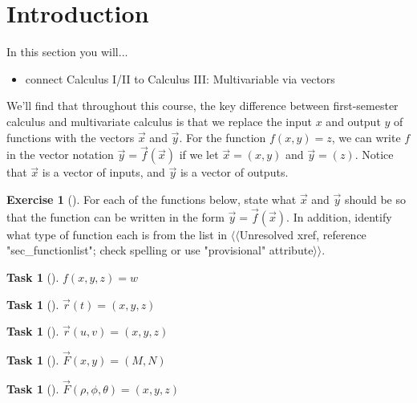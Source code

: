 \documentclass[10pt,]{book}
\theoremstyle{plain}
\theoremstyle{definition}
\theoremstyle{definition}
\theoremstyle{definition}
\theoremstyle{definition}
\newtheorem{exploration}[project]{Exercise}
\newtheorem{task}[project]{Task}
\theoremstyle{definition}
\numberwithin{equation}{section}
\begin{document}
\section[{Introduction}]{Introduction}\label{section-20}
In this section you will... \leavevmode%
\begin{itemize}[label=\textbullet]
\item{}connect Calculus I/II to Calculus III: Multivariable via vectors%
\end{itemize}
%
\par
We'll find that throughout this course, the key difference between first-semester calculus and multivariate calculus is that we replace the input \(x\) and output \(y\) of functions with the vectors \(\vec x\) and \(\vec y\). For the function \(f(x,y)=z\), we can write \(f\) in the vector notation \(\vec y=\vec f(\vec x)\) if we let \(\vec x=(x,y)\) and \(\vec y=(z)\). Notice that \(\vec x\) is a vector of inputs, and \(\vec y\) is a vector of outputs.%
\begin{exploration}[]\label{exploration-131}
For each of the functions below, state what \(\vec x\) and \(\vec y\) should be so that the function can be written in the form \(\vec y = \vec f (\vec x)\). In addition, identify what type of function each is from the list in {$\langle\langle$Unresolved xref, reference "sec\_functionlist"; check spelling or use "provisional" attribute$\rangle\rangle$}. %
\begin{task}[]\label{task-258}
\(f(x,y,z)=w\)%
\end{task}
\begin{task}[]\label{task-259}
\(\vec r(t)=(x,y,z)\)%
\end{task}
\begin{task}[]\label{task-260}
\(\vec r(u,v)=(x,y,z)\)%
\end{task}
\begin{task}[]\label{task-261}
\(\vec F(x,y)=(M,N)\)%
\end{task}
\begin{task}[]\label{task-262}
\(\vec F(\rho,\phi,\theta)=(x,y,z)\)%
\end{task}
\end{exploration}
\typeout{************************************************}
\typeout{************************************************}
\end{document}
